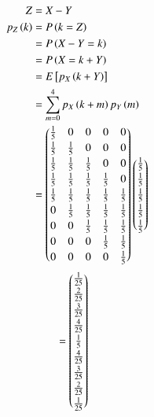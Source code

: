 \documentclass[journal,12pt,onecolumn]{IEEEtran}
\theoremstyle{remark}
\begin{document}
\begin{align}
	Z &= X - Y\\
	p_Z\brak{k} &= P\brak{k = Z} \\
	&= P\brak{X-Y = k}\\
	&= P\brak{X = k + Y}\\
	&= E\sbrak{p_X\brak{k + Y}}\\
	&= \sum_{m = 0}^{4} p_X\brak{k + m} p_Y\brak{m}\\
	&= \myvec{\frac{1}{5} & 0 & 0 & 0 & 0 \vspace{2pt} \\
		  \frac{1}{5} & \frac{1}{5} & 0 & 0 & 0 \vspace{2pt}\\
		  \frac{1}{5} & \frac{1}{5} & \frac{1}{5} & 0 & 0 \vspace{2pt}\\
		  \frac{1}{5} & \frac{1}{5} & \frac{1}{5} & \frac{1}{5} & 0 \vspace{2pt}\\
		  \frac{1}{5} & \frac{1}{5} & \frac{1}{5} & \frac{1}{5} & \frac{1}{5} \vspace{2pt}\\
		  0 & \frac{1}{5} & \frac{1}{5} & \frac{1}{5} & \frac{1}{5} \vspace{2pt}\\
		  0 & 0 & \frac{1}{5} & \frac{1}{5} & \frac{1}{5}\vspace{2pt}\\
		  0 & 0 & 0 & \frac{1}{5} & \frac{1}{5} \vspace{2pt}\\
		  0 & 0 & 0 & 0 & \frac{1}{5}}
	  \myvec{\frac{1}{5} \vspace{2pt} \\ \frac{1}{5} \vspace{2pt} \\ \frac{1}{5} \vspace{2pt} \\ \frac{1}{5} \vspace{2pt} \\ \frac{1}{5}}
\end{align}
\begin{align}
	&= \myvec{\frac{1}{25} \vspace{2pt}\\ \frac{2}{25} \vspace{2pt} \\ \frac{3}{25} \vspace{2pt} \\ \frac{4}{25} \vspace{2pt} \\ \frac{1}{5} \vspace{2pt}\\	  \frac{4}{25} \vspace{2pt} \\ \frac{3}{25} \vspace{2pt} \\ \frac{2}{25} \vspace{2pt} \\ \frac{1}{25}}
\end{align}
\end{document}
